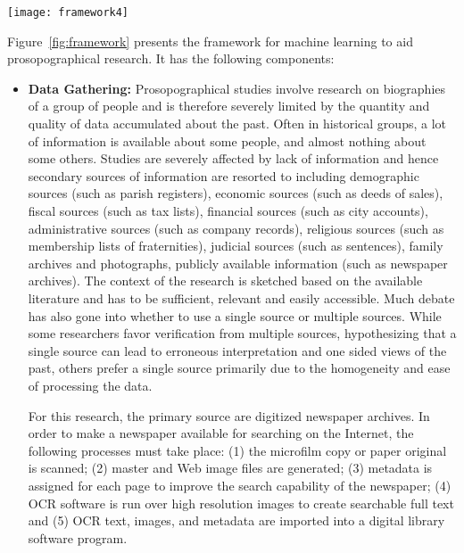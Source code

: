 \begin{figure*}
\centering
\texttt{[image: framework4]}
\caption{Research Framework showing components of proposed solution}
\label{fig:framework}
\end{figure*} 

Figure~\ref{fig:framework} presents the framework for machine learning to aid prosopographical research. It has the following components:

\begin{itemize}
\item \textbf{Data Gathering: } Prosopographical studies involve research on biographies of a group of people and is therefore severely limited by the quantity and quality of data accumulated about the past. Often in historical groups, a lot of information is available about some people, and almost nothing about some others. Studies are severely affected by lack of information and hence secondary sources of information are resorted to including demographic sources (such as parish registers), economic sources (such as deeds of sales), fiscal sources (such as tax lists), financial sources (such as city accounts), administrative sources (such as company records), religious sources (such as membership lists of fraternities), judicial sources (such as sentences), family archives and photographs, publicly available information (such as newspaper archives). The context of the research is sketched based on the available literature and has to be sufficient, relevant and easily accessible. Much debate has also gone into whether to use a single source or multiple sources. While some researchers favor verification from multiple sources, hypothesizing that a single source can lead to erroneous interpretation and one sided views of the past, others prefer a single source primarily due to the homogeneity and ease of processing the data. 

For this research, the primary source are digitized newspaper archives. In order to make a newspaper available for searching on the Internet,
the following processes \cite{dutta2011learning} must take place: (1) the microfilm copy or
paper original is scanned; (2) master and Web image files are
generated; (3) metadata is assigned for each page to improve the
search capability of the newspaper; (4) OCR software is run over high
resolution images to create searchable full text and (5) OCR text,
images, and metadata are imported into a digital library software
program. 


\end{itemize}
